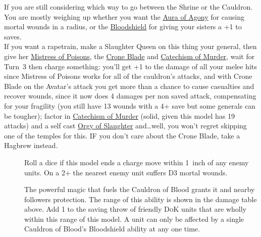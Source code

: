 If you are still considering which way to go between the Shrine or the
Cauldron. You are mostly weighing up whether you want the
\hyperref[aura-of-agony]{Aura of Agony} for causing mortal wounds in a radius,
or the \hyperref[bloodshield]{Bloodshield} for giving your sisters a +1 to
saves.\\

If you want a rapetrain, make a Slaughter Queen on this thing your general,
then give her \hyperref[mistress-of-poisons]{Mistress of Poisons}, the
\hyperref[crone-blade]{Crone Blade} and
\hyperref[catechism-of-murder]{Catechism of Murder}, wait for Turn~3 then
charge something: you'll get +1 to the damage of all your melee hits since
Mistress of Poisons works for all of the cauldron's attacks, and with Crone
Blade on the Avatar's attack you get more than a chance to cause casualties and
recover wounds, since it now does 4 damages per non saved attack, compensating
for your fragility (you still have 13 wounds with a 4+ save but some generals
can be tougher); factor in \hyperref[catechism-of-murder]{Catechism of Murder}
(solid, given this model has 19 attacks) and a self cast
\hyperref[orgy-of-slaughter]{Orgy of Slaughter} and\ldots well, you won't
regret skipping one of the temples for this. IF you don't care about the Crone
Blade, take a Hagbrew instead.\\

\begin{description}
    \item [] Roll a dice if this model
        ends a charge move within 1~inch of any enemy units. On a 2+ the
        nearest enemy unit suffers D3 mortal wounds.
    \item [] The powerful magic that fuels
        the Cauldron of Blood grants it and nearby followers protection. The
        range of this ability is shown in the damage table above. Add 1 to the
        saving throw of friendly \textsc{DoK} units that are wholly
        within this range of this model. A unit can only be affected by
        a single Cauldron of Blood’s Bloodshield ability at any one time.
\end{description}


